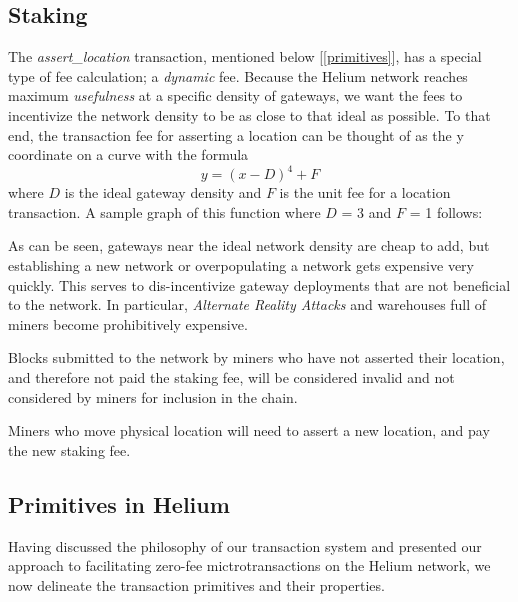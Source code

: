 \documentclass[UTF8, 10pt, nonatbib, nocopyrightspace, reprint]{sigplanconf}
\newcommand{\secref}[1]{[\autoref{#1}]}
\begin{document}
\subsection{Staking} \label{staking}

The \emph{assert\_location} transaction, mentioned below \secref{primitives}, has a special type of fee calculation; a \emph{dynamic} fee. Because the Helium network reaches maximum \emph{usefulness} at a specific density of gateways, we want the fees to incentivize the network density to be as close to that ideal as possible. To that end, the transaction fee for asserting a location can be thought of as the y coordinate on a curve with the formula \[\mathit{y = \left(x - D\right)^4 + F}\] where $D$ is the ideal gateway density and $F$ is the unit fee for a location transaction. A sample graph of this function where $D$ = 3 and $F$ = 1 follows:

\pgfplotsset{width=12cm,compat=1.9}

As can be seen, gateways near the ideal network density are cheap to add, but establishing a new network or overpopulating a network gets expensive very quickly. This serves to dis-incentivize gateway deployments that are not beneficial to the network. In particular, \emph{Alternate Reality Attacks} and warehouses full of miners become prohibitively expensive.

Blocks submitted to the network by miners who have not asserted their location, and therefore not paid the staking fee, will be considered invalid and not considered by miners for inclusion in the chain.

Miners who move physical location will need to assert a new location, and pay the new staking fee.

\subsection{Primitives in Helium} \label{primitives}
Having discussed the philosophy of our transaction system and presented our approach to facilitating zero-fee mictrotransactions on the Helium network, we now delineate the transaction primitives and their properties.
\end{document}
